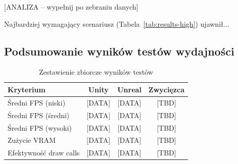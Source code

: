 [ANALIZA -- wypełnij po zebraniu danych]

Najbardziej wymagający scenariusz (Tabela~\ref{tab:results-high}) ujawnił...

\subsection{Podsumowanie wyników testów wydajności}

\begin{table}[h!]
    \centering
    \caption{Zestawienie zbiorcze wyników testów}
    \label{tab:summary}
    \begin{tabular}{|l|c|c|c|}
        \hline
        \textbf{Kryterium} & \textbf{Unity} & \textbf{Unreal} & \textbf{Zwycięzca} \\
        \hline\hline
        Średni FPS (niski) & [DATA] & [DATA] & [TBD] \\
        \hline
        Średni FPS (średni) & [DATA] & [DATA] & [TBD] \\
        \hline
        Średni FPS (wysoki) & [DATA] & [DATA] & [TBD] \\
        \hline
        Zużycie VRAM & [DATA] & [DATA] & [TBD] \\
        \hline
        Efektywność draw calls & [DATA] & [DATA] & [TBD] \\
        \hline
    \end{tabular}
\end{table}
